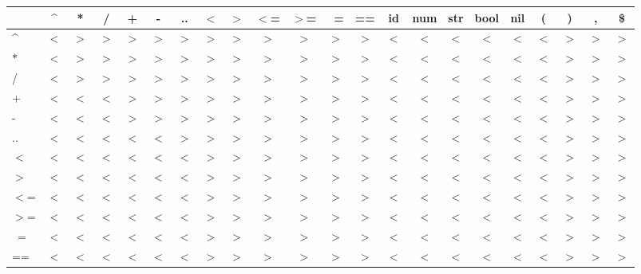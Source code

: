 \begin{sidewaystable}
\centering
\begin{tabular}{l | c c c c c c c c c c c c c c c c c c c c c}
      & \^{} & * & / & + & - & ..& $<$ & $>$ & $<$= & $>$= & ~= & == & id & num & str & bool & nil & (  & )  & ,  & \$ \\ \hline
  \^{}  & $<$ & $>$ & $>$ & $>$ & $>$ & $>$ & $>$ & $>$ & $>$  & $>$  & $>$  & $>$  & $<$  & $<$   & $<$   & $<$    &  $<$  & $<$  & $>$  & $>$  & $>$ \\
  $*$   & $<$ & $>$ & $>$ & $>$ & $>$ & $>$ & $>$ & $>$ & $>$  & $>$  & $>$  & $>$  & $<$  & $<$   & $<$   & $<$    &  $<$  & $<$  & $>$  & $>$  & $>$ \\
  /     & $<$ & $>$ & $>$ & $>$ & $>$ & $>$ & $>$ & $>$ & $>$  & $>$  & $>$  & $>$  & $<$  & $<$   & $<$   & $<$    &  $<$  & $<$  & $>$  & $>$  & $>$ \\
  +     & $<$ & $<$ & $<$ & $>$ & $>$ & $>$ & $>$ & $>$ & $>$  & $>$  & $>$  & $>$  & $<$  & $<$   & $<$   & $<$    &  $<$  & $<$  & $>$  & $>$  & $>$ \\
  -     & $<$ & $<$ & $<$ & $>$ & $>$ & $>$ & $>$ & $>$ & $>$  & $>$  & $>$  & $>$  & $<$  & $<$   & $<$   & $<$    &  $<$  & $<$  & $>$  & $>$  & $>$ \\
  ..    & $<$ & $<$ & $<$ & $<$ & $<$ & $>$ & $>$ & $>$ & $>$  & $>$  & $>$  & $>$  & $<$  & $<$   & $<$   & $<$    &  $<$  & $<$  & $>$  & $>$  & $>$ \\
  $<$     & $<$ & $<$ & $<$ & $<$ & $<$ & $<$ & $>$ & $>$ & $>$  & $>$  & $>$  & $>$  & $<$  & $<$   & $<$   & $<$    &  $<$  & $<$  & $>$  & $>$  & $>$ \\
  $>$     & $<$ & $<$ & $<$ & $<$ & $<$ & $<$ & $>$ & $>$ & $>$  & $>$  & $>$  & $>$  & $<$  & $<$   & $<$   & $<$    &  $<$  & $<$  & $>$  & $>$  & $>$ \\
  $<$=    & $<$ & $<$ & $<$ & $<$ & $<$ & $<$ & $>$ & $>$ & $>$  & $>$  & $>$  & $>$  & $<$  & $<$   & $<$   & $<$    &  $<$  & $<$  & $>$  & $>$  & $>$ \\
  $>$=    & $<$ & $<$ & $<$ & $<$ & $<$ & $<$ & $>$ & $>$ & $>$  & $>$  & $>$  & $>$  & $<$  & $<$   & $<$   & $<$    &  $<$  & $<$  & $>$  & $>$  & $>$ \\
  ~=    & $<$ & $<$ & $<$ & $<$ & $<$ & $<$ & $>$ & $>$ & $>$  & $>$  & $>$  & $>$  & $<$  & $<$   & $<$   & $<$    &  $<$  & $<$  & $>$  & $>$  & $>$ \\
  ==    & $<$ & $<$ & $<$ & $<$ & $<$ & $<$ & $>$ & $>$ & $>$  & $>$  & $>$  & $>$  & $<$  & $<$   & $<$   & $<$    &  $<$  & $<$  & $>$  & $>$  & $>$ \\

\end{tabular}
\end{sidewaystable}
